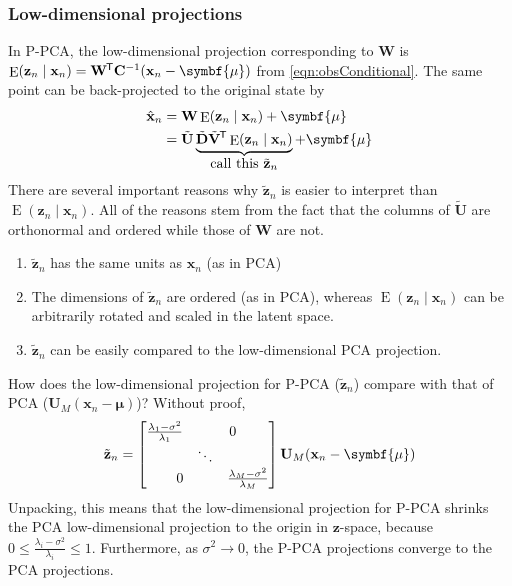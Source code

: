 \documentclass[11pt]{article}
\DeclareMathOperator{\E}{E}
\newcommand{\xb}{\mathbf{x}}
\newcommand{\zb}{\mathbf{z}}
\newcommand{\ub}{\symbf{\mu}}
\newcommand{\Wb}{\mathbf{W}}
\newcommand*{\tran}{^{\mkern-1.5mu\mathsf{T}}}
\begin{document}
\subsubsection*{Low-dimensional projections}
In P-PCA, the low-dimensional projection corresponding to $\Wb$ is $\E(\zb_n
\mid \xb_n) = \Wb\tran \mathbf{C}^{-1}(\xb_n - \ub)$ from
\eqref{eqn:obsConditional}. The same point can be back-projected to the
original state by
\begin{align*}
  \hat{\xb}_n &= \Wb \E(\zb_n \mid \xb_n) + \ub \\
  &= \tilde{\mathbf{U}} \underbrace{\tilde{\mathbf{D}} \tilde{\mathbf{V}}\tran
    \E(\zb_n \mid \xb_n)}_{\mathclap{\text{\normalsize call this $\tilde{\zb}_n$}}} + \ub
\end{align*}
There are several important reasons why $\tilde{\zb}_n$ is easier to interpret
than $\E(\zb_n \mid \xb_n)$. All of the reasons stem from the fact that the
columns of $\tilde{\mathbf{U}}$ are orthonormal and ordered while those of $\Wb$
are not.
\begin{enumerate}
  \item $\tilde{\zb}_n$ has the same units as $\xb_n$ (as in PCA)
  \item The dimensions of $\tilde{\zb}_n$ are ordered (as in PCA), whereas
  $\E(\zb_n \mid \xb_n)$ can be arbitrarily rotated and scaled in the latent
  space.
  \item $\tilde{\zb}_n$ can be easily compared to the low-dimensional PCA
  projection.
\end{enumerate}

How does the low-dimensional projection for P-PCA ($\tilde{\zb}_n$) compare
with that of PCA ($\mathbf{U}_M (\xb_n - \ub)$)? Without proof,
\begin{equation}
  \tilde{\zb}_n =
  \begin{bmatrix}
    \frac{\lambda_1 - \sigma^2}{\lambda_1} & \multicolumn{2}{c}{0} \\
     & \ddots &  \\
    \multicolumn{2}{c}{0} & \frac{\lambda_M - \sigma^2}{\lambda_M} \\
  \end{bmatrix}
  \mathbf{U}_M (\xb_n - \ub)
\end{equation}
Unpacking, this means that the low-dimensional projection for P-PCA shrinks
the PCA low-dimensional projection to the origin in $\zb$-space, because $0
\leq \frac{\lambda_i - \sigma^2}{\lambda_i} \leq 1$. Furthermore, as
$\sigma^2 \rightarrow 0$, the P-PCA projections converge to the PCA projections.
\end{document}
